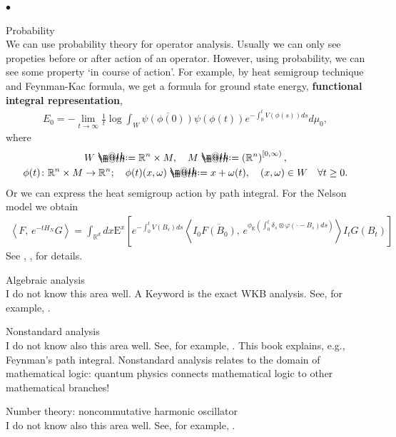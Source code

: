 \documentclass[openany, a4paper, oneside]{book}
\makeatletter
\newcounter{enum2}
\renewenvironment{itemize}{%
\begin{list}{$\bullet$\ \ }%
{%
\usecounter{enum2}
\setlength{\itemindent}{0pt}%
\setlength{\leftmargin}{6pt}%
\setlength{\rightmargin}{0pt}%
\setlength{\labelsep}{0pt}%
\setlength{\labelwidth}{6pt}%
\setlength{\itemsep}{0pt}%
\setlength{\parsep}{0pt}%
\setlength{\listparindent}{0pt}%
}
}{%
\end{list}%
}
\newcommand*{\defeq}{\mathrel{\rlap{%
\raisebox{0.3ex}{$\m@th\cdot$}}%
\raisebox{-0.3ex}{$\m@th\cdot$}}%
=}
\theoremstyle{break}
\theoremstyle{breakdefn}
\newcommand{\rbk}[1]{\left (#1\right)}
\newcommand{\sqbk}[1]{\left[#1\right]}
\newcommand{\bkt}[2]{\left\langle#1,\,#2\right\rangle}
\newcommand{\bbRd}{\mathbb{R}^d}
\newcommand{\bbRn}{\mathbb{R}^n}
\newcommand{\rmE}{\mathrm{E}}
\makeatother
\begin{document}
\begin{itemize}
\item Probability\\
\label{sec-7-10-1-4-1-3}%
We can use probability theory for operator analysis.
Usually we can only see propeties before or after action of an operator.
However, using probability, we can see some property `in course of action'.
For example, by heat semigroup technique and Feynman-Kac formula, we get a formula for ground state energy,
\textbf{functional integral representation},
\begin{align}
 E_0
 =
 -\lim_{t \to \infty} \frac{1}{t} \log \int_{W} \overline{\psi \rbk{\phi (0)}} \psi \rbk{\phi (t)} e^{- \int_0^t V (\phi (s)) ds} d\mu_0,
\end{align}
where
\begin{gather}
 W
 \defeq
 \bbRn \times M, \quad
 M
 \defeq
 \rbk{\bbRn}^{[0, \infty)}, \\
 \phi (t) \colon \bbRn \times M \to \bbRn; \quad
 \phi (t) (x, \omega) \defeq x + \omega (t), \quad (x, \omega) \in W \quad \forall t \geq 0.
\end{gather}
Or we can express the heat semigroup action by path integral.
For the Nelson model we obtain
\begin{align}
 \bkt{F}{e^{- t H_N} G}
 =
 \int_{\bbRd} dx \rmE^{x}
 \sqbk{e^{- \int_0^t V (B_s) ds} \bkt{I_0 \overline{F (B_0)}}{e^{\phi_{\mathrm{E}} \rbk{\int_0^t \delta_s \otimes \varphi (\cdot - B_s) ds}}}{I_t G (B_t)}}
\end{align}
See \cite{LorincziHiroshimaBetz1}, \cite{AsaoArai5}, \cite{SimonBarry2} for details.

\item Algebraic analysis\\
\label{sec-7-10-1-4-1-4}%
I do not know this area well.
A Keyword is the exact WKB analysis.
See, for example, \cite{KawaiTakei1}.

\item Nonstandard analysis\\
\label{sec-7-10-1-4-1-5}%
I do not know also this area well.
See, for example, \cite{TohruNakamura1}.
This book explains, e.g., Feynman's path integral.
Nonstandard analysis relates to the domain of mathematical logic:
quantum physics connects mathematical logic to other mathematical branches!

\item Number theory: noncommutative harmonic oscillator\\
\label{sec-7-10-1-4-1-6}%
I do not know also this area well.
See, for example, \cite{AlbertoParmeggiani1, MasatoWakayama1}.


\end{itemize}
\end{document}
